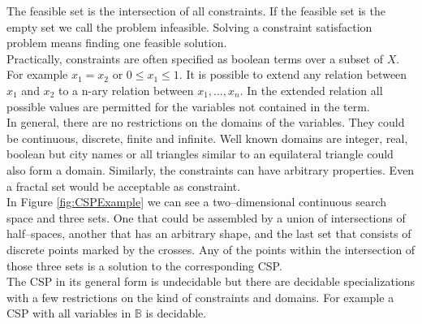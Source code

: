 The feasible set is the intersection of all constraints. If the feasible set is the empty set we call the problem infeasible. Solving a constraint satisfaction problem means finding one feasible solution.\\
Practically, constraints are often specified as boolean terms over a subset of $X$. For example $x_1=x_2$ or $0\leq x_1 \leq 1$. 
It is possible to extend any relation between $x_1$ and $x_2$ to a n-ary relation between $x_1,\dots,x_n$. In the extended relation all possible values are permitted for the variables not contained in the term.\\
In general, there are no restrictions on the domains of the variables. They could be continuous, discrete, finite and infinite. Well known domains are integer, real, boolean but city names or all triangles similar to an equilateral triangle could also form a domain. Similarly, the constraints can have arbitrary properties. Even a fractal set would be acceptable as constraint.\\
In Figure \ref{fig:CSPExample} we can see a two--dimensional continuous search space and three sets. One that could be assembled by a union of intersections of half--spaces, another that has an arbitrary shape, and the last set that consists of discrete points marked by the crosses. Any of the points within the intersection of those three sets is a solution to the corresponding CSP.\\
The CSP in its general form is undecidable but there are decidable specializations with a few restrictions on the kind of constraints and domains. For example a CSP with all variables in $\mathbb{B}$ is decidable.


